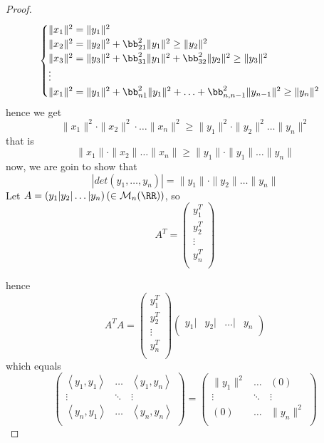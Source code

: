 \begin{proof}
\[
\begin{cases}
	\| x_1 \| ^2  = \| y_1 \| ^2  \\
	\| x_2 \| ^2  = 
	\| y_2 \| ^2  + \bb_{21}^2 
	\| y_1 \| ^2   \geq \| y_2 \| ^2 
	\\  
	\| x_3 \| ^2 = 
	\| y_3 \| ^2 + \bb_{31}^2 \| y_1 \| ^2  + 
	\bb_{32}^2 \| y_2 \| ^2  
	\geq \| y_3 \| ^2 
	\\
	\vdots \\
	\| x_1 \| ^2  = 
	\| y_1 \| ^2  + \bb_{n1}^2  
	\| y_1 \| ^2 +   \hdots +
	\bb_{n,n-1}^2  \| y_{n-1} \| ^2  
	\geq \| y_n  \| ^2 
\end{cases}
\]
hence we get 
\[
	\| x_1 \| ^2 \cdot 
	\| x_2 \| ^2  \cdot \hdots 
	\| x_n  \|  ^2  \geq 
	\| y_1 \| ^2  \cdot  \| y_2 \| ^2 
	 \hdots   \| y_n \| ^2 
\]
that is 
\[
\| x_1 \| \cdot  \| x_2 \| \hdots \| x_n  \|  
\geq 
\| y_1 \| \cdot  \| y_1 \|  
\hdots  
\| y_n  \| 
\]
now, we are goin to show that 
\[
	\left| det(y_1, \hdots , y_n )  \right| 
	= 
	\| y_1 \| \cdot \| y_2 \|  \hdots 
	\| y_n  \| 
\]
Let $A = \left( y_1|y_2| \hdots| y_n  \right)  
\left( \in  \mathcal{M}_{n} (\RR )  \right)$, 
so 
\[
A^{T} = 
\begin{pmatrix}
	y_1^{T} \\
	\hline y_2^{T} \\
	\hline \vdots  \\
	\hline y_n ^{T} \\
\end{pmatrix}
\]

hence
\[
A^{T} A = 
\begin{pmatrix}
	y_1^{T} \\
	\hline y_2^{T} \\
	\vdots  \\
	\hline y_n ^{T} \\
\end{pmatrix}
\begin{pmatrix}
	 y_1|& y_2|  & \hdots|   & y_n   \\
\end{pmatrix}
\]
which equals
\[
	\begin{pmatrix}
		 \left\langle 
		 y_1, y_1\right\rangle & \hdots  & 
		 \left\langle y_1,y_n  \right\rangle \\
		\vdots  &  \ddots &  \vdots \\
		\left\langle y_n ,y_1 \right\rangle  & \hdots 
						     & 
		\left\langle y_{n},y_{n} \right\rangle \\
	\end{pmatrix}
	= 
	\begin{pmatrix}
		\| y_1 \| ^2  & \hdots  & (0)  \\
		\vdots  & \ddots  & \vdots  \\
		(0)  & \hdots  & \| y_n  \|^2   \\
	\end{pmatrix}
\]


\end{proof}
